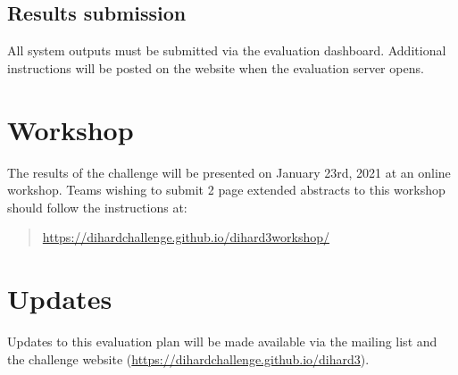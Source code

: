 \documentclass{article}
\begin{document}
\subsection{Results submission}
All system outputs must be submitted via the evaluation dashboard. Additional instructions will be posted on the website when the evaluation server opens.


\section{Workshop}
The results of the challenge will be presented on January 23rd, 2021 at an online workshop. Teams wishing to submit 2 page extended abstracts to this workshop should follow the instructions at:
    \begin{quote}
        \url{https://dihardchallenge.github.io/dihard3workshop/}
    \end{quote}



\section{Updates}
Updates to this evaluation plan will be made available via the mailing list and the challenge website (\url{https://dihardchallenge.github.io/dihard3}).
\end{document}
